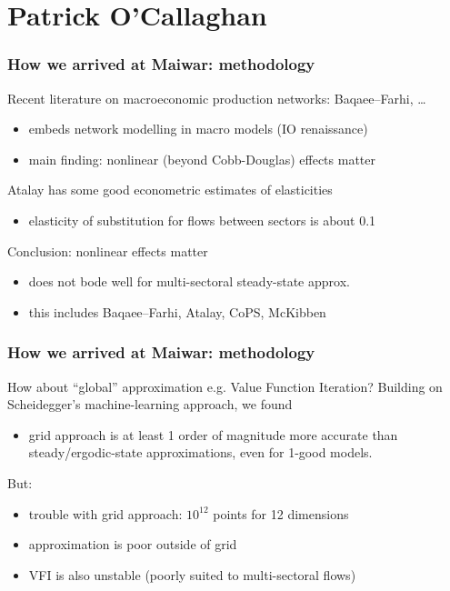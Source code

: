 \documentclass[handout,english]{beamer}
\begin{document}
\section{Patrick O'Callaghan}
\begin{frame}
  \frametitle{How we arrived at Maiwar: methodology}
  Recent literature on macroeconomic production networks: Baqaee--Farhi, \dots
  \begin{itemize}
    \item embeds network modelling in macro models (IO renaissance)
    \item main finding: nonlinear (beyond Cobb-Douglas) effects matter
  \end{itemize}
  Atalay has some good econometric estimates of elasticities
  \begin{itemize}
    \item elasticity of substitution for flows between sectors is about 0.1
  \end{itemize}
  Conclusion: nonlinear effects matter
  \begin{itemize}
    \item {\color{patrickcolor3}
      does not bode well for multi-sectoral steady-state approx.}
    \item this includes Baqaee--Farhi, Atalay, CoPS, McKibben
  \end{itemize}
\end{frame}
\begin{frame}
  \frametitle{How we arrived at Maiwar: methodology}
  How about ``global'' approximation e.g. Value Function Iteration?
  Building on Scheidegger's machine-learning approach, we found
  \begin{itemize}
    \item grid approach is at least 1 order of magnitude more accurate than 
      steady/ergodic-state approximations, even for 1-good models.
  \end{itemize}
  But:
  \begin{itemize}
    \item trouble with grid approach: $10 ^ {12}$ points for 12 dimensions
    \item approximation is poor outside of grid
    \item VFI is also unstable (poorly suited to multi-sectoral flows)
  \end{itemize}
\end{frame}
\end{document}
